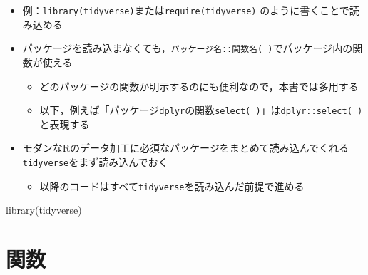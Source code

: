 \documentclass[
  xelatex,ja=standard, b5paper]{bxjsbook}
\newenvironment{Shaded}{\begin{snugshade}}{\end{snugshade}}
\newcommand{\FunctionTok}[1]{\textcolor[rgb]{0.00,0.00,0.00}{#1}}
\newcommand{\NormalTok}[1]{#1}
\providecommand{\tightlist}{%
  \setlength{\itemsep}{0pt}\setlength{\parskip}{0pt}}
\begin{document}
\begin{itemize}
\tightlist
\item
  例：\texttt{library(tidyverse)}または\texttt{require(tidyverse)} のように書くことで読み込める
\item
  パッケージを読み込まなくても，\texttt{パッケージ名::関数名(\ )}でパッケージ内の関数が使える

  \begin{itemize}
  \tightlist
  \item
    どのパッケージの関数か明示するのにも便利なので，本書では多用する
  \item
    以下，例えば「パッケージ\texttt{dplyr}の関数\texttt{select(\ )}」は\texttt{dplyr::select(\ )}と表現する
  \end{itemize}
\item
  モダンなRのデータ加工に必須なパッケージをまとめて読み込んでくれる\texttt{tidyverse}をまず読み込んでおく

  \begin{itemize}
  \tightlist
  \item
    以降のコードはすべて\texttt{tidyverse}を読み込んだ前提で進める
  \end{itemize}
\end{itemize}

\begin{Shaded}
\begin{Highlighting}[]
\FunctionTok{library}\NormalTok{(tidyverse)}
\end{Highlighting}
\end{Shaded}

\hypertarget{p-function}{%
\section{関数}\label{p-function}}
\end{document}
